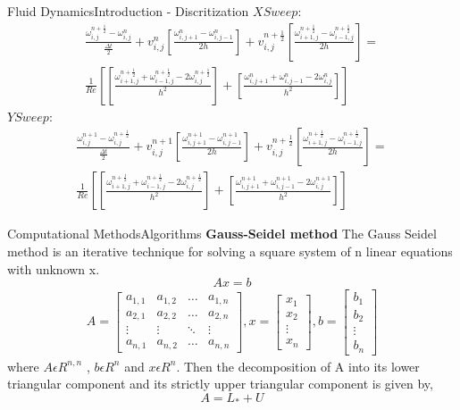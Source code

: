 \documentclass[11pt]{beamer}
\begin{document}
\begin{frame}{Fluid Dynamics}{Introduction - Discritization}
$X Sweep :$
\begin{eqnarray}\label{uomega1}
\frac{\omega_{i,j}^{n+\frac{1}{2}} - \omega_{i,j}^{n}}{\frac{\Delta t}{2}} + v_{i,j}^{n} \left[\frac{\omega_{i,j+1}^{n} - \omega_{i,j-1}^{n}}{2h} \right] +  v_{i,j}^{n+\frac{1}{2}} \left[\frac{\omega_{i+1,j}^{n+\frac{1}{2}} - \omega_{i-1,j}^{n+\frac{1}{2}}}{2h} \right] = \nonumber \\
 \frac{1}{Re} \left[ \left[ \frac{\omega_{i+1,j}^{n+\frac{1}{2}} + \omega_{i-1,j}^{n+\frac{1}{2}} - 2\omega_{i,j}^{n+\frac{1}{2}}}{h^{2}} \right] +  \left[ \frac{\omega_{i,j+1}^{n} + \omega_{i,j-1}^{n} - 2\omega_{i,j}^{n}}{h^{2}} \right] \right] 
\end{eqnarray}
$Y Sweep :$
\begin{eqnarray}\label{uomega2}
\frac{\omega_{i,j}^{n+1} - \omega_{i,j}^{n+\frac{1}{2}}}{\frac{\Delta t}{2}} + v_{i,j}^{n+1} \left[\frac{\omega_{i,j+1}^{n+1} - \omega_{i,j-1}^{n+1}}{2h} \right] +  v_{i,j}^{n+\frac{1}{2}} \left[\frac{\omega_{i+1,j}^{n+\frac{1}{2}} - \omega_{i-1,j}^{n+\frac{1}{2}}}{2h} \right] = \nonumber \\
\frac{1}{Re} \left[ \left[ \frac{\omega_{i+1,j}^{n+\frac{1}{2}} + \omega_{i-1,j}^{n+\frac{1}{2}} - 2\omega_{i,j}^{n+\frac{1}{2}}}{h^{2}} \right] +  \left[ \frac{\omega_{i,j+1}^{n+1} + \omega_{i,j-1}^{n+1} - 2\omega_{i,j}^{n+1}}{h^{2}} \right] \right] 
\end{eqnarray}
\end{frame}


\begin{frame}{Computational Methods}{Algorithms}
\textbf{Gauss-Seidel method}\linebreak
The Gauss Seidel method is an iterative technique for solving a square system of n linear equations with unknown x.
$$Ax=b$$
\begin{eqnarray}
A=\begin{bmatrix}
a_{1,1} & a_{1,2} & \ldots & a_{1,n} \\ 
a_{2,1} & a_{2,2} & \ldots & a_{2,n}\\ 
\vdots & \vdots & \ddots & \vdots \\ 
a_{n,1} & a_{n,2} & \ldots & a_{n,n}
\end{bmatrix} ,
x = \begin{bmatrix}
x_{1}\\ 
x_{2}\\ 
\vdots\\ 
x_{n}
\end{bmatrix} ,   
b = \begin{bmatrix}
b_{1}\\ 
b_{2}\\ 
\vdots\\ 
b_{n}
\end{bmatrix}
\end{eqnarray}
where $A \epsilon R^{n,n}$ , $b \epsilon R^{n}$ and $x \epsilon R^{n}$.
Then the decomposition of A into its lower triangular component and its strictly upper triangular component is given by,
$$A=L_{*}+U$$
\end{frame}
\end{document}

